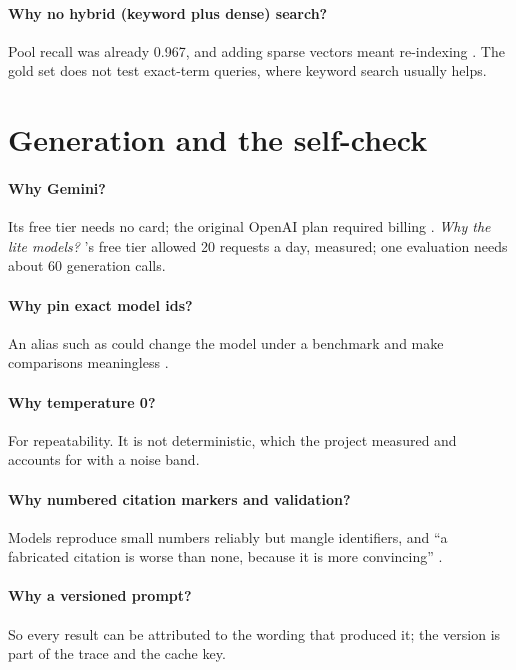 \paragraph{Why no hybrid (keyword plus dense) search?} Pool recall was already 0.967, and adding sparse vectors meant re-indexing . \tagI The gold set does not test exact-term queries, where keyword search usually helps.

\section{Generation and the self-check}

\paragraph{Why Gemini?} Its free tier needs no card; the original OpenAI plan required billing . \emph{Why the lite models?} 's free tier allowed 20 requests a day, measured; one evaluation needs about 60 generation calls.

\paragraph{Why pin exact model ids?} An alias such as  could change the model under a benchmark and make comparisons meaningless .

\paragraph{Why temperature 0?} For repeatability. It is not deterministic, which the project measured and accounts for with a noise band.

\paragraph{Why numbered citation markers and validation?} Models reproduce small numbers reliably but mangle identifiers, and \enquote{a fabricated citation is worse than none, because it is more convincing} .

\paragraph{Why a versioned prompt?} So every result can be attributed to the wording that produced it; the version is part of the trace and the cache key.

